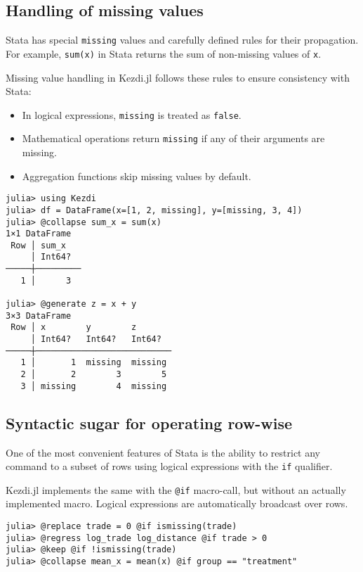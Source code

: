 \documentclass{juliacon}
\begin{document}
\subsection{Handling of missing values}

Stata has special \texttt{missing} values and carefully defined rules for their propagation. For example, \texttt{sum(x)} in Stata returns the sum of non-missing values of \texttt{x}.

Missing value handling in Kezdi.jl follows these rules to ensure consistency with Stata:

\begin{itemize}
	\item In logical expressions, \texttt{missing} is treated as \texttt{false}.
	\item Mathematical operations return \texttt{missing} if any of their arguments are missing.
	\item Aggregation functions skip missing values by default.
\end{itemize}

\begin{verbatim}
julia> using Kezdi
julia> df = DataFrame(x=[1, 2, missing], y=[missing, 3, 4])
julia> @collapse sum_x = sum(x)
1×1 DataFrame
 Row │ sum_x   
     │ Int64?  
─────┼─────────
   1 │      3

julia> @generate z = x + y
3×3 DataFrame
 Row │ x        y        z
     │ Int64?   Int64?   Int64?
─────┼───────────────────────────
   1 │       1  missing  missing
   2 │       2        3        5
   3 │ missing        4  missing
\end{verbatim}

\subsection{Syntactic sugar for operating row-wise}

One of the most convenient features of Stata is the ability to restrict any command to a subset of rows using logical expressions with the \texttt{if} qualifier.

Kezdi.jl implements the same with the \texttt{@if} macro-call, but without an actually implemented macro. Logical expressions are automatically broadcast over rows.

\begin{verbatim}
julia> @replace trade = 0 @if ismissing(trade)
julia> @regress log_trade log_distance @if trade > 0
julia> @keep @if !ismissing(trade) 
julia> @collapse mean_x = mean(x) @if group == "treatment"
\end{verbatim}
\end{document}
